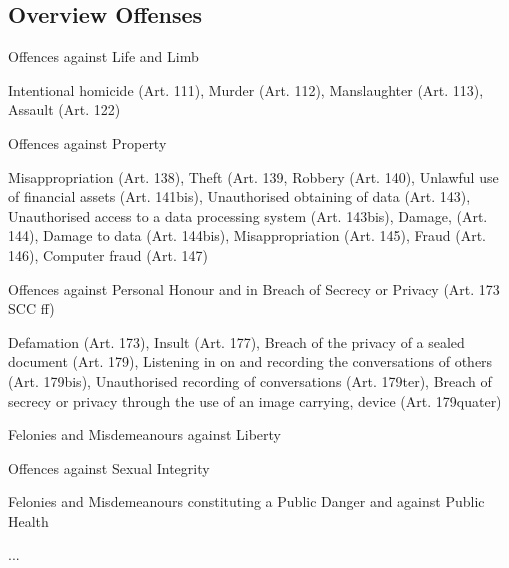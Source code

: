 \subsection{Overview Offenses}
\begin{compactitem}
	\item Offences against Life and Limb
	\begin{compactitem}
		\item Intentional homicide (Art. 111), Murder (Art. 112), Manslaughter (Art. 113), Assault (Art. 122)
	\end{compactitem}
	\item Offences against Property
	\begin{compactitem}
		\item Misappropriation (Art. 138), Theft (Art. 139, Robbery (Art. 140), Unlawful use of financial assets (Art. 141bis), Unauthorised obtaining of data (Art. 143), Unauthorised access to a data processing system (Art. 143bis), Damage, (Art. 144), Damage to data (Art. 144bis), Misappropriation (Art. 145), Fraud (Art. 146), Computer fraud (Art. 147)
	\end{compactitem}
	\item Offences against Personal Honour and in Breach of Secrecy or Privacy (Art. 173 SCC ff)
	\begin{compactitem}
		\item Defamation (Art. 173), Insult (Art. 177), Breach of the privacy of a sealed document (Art. 179), Listening in on and recording the conversations of others (Art. 179bis), Unauthorised recording of conversations (Art. 179ter), Breach of secrecy or privacy through the use of an image carrying, device (Art. 179quater)
	\end{compactitem}
	\item Felonies and Misdemeanours against Liberty
	\item Offences against Sexual Integrity
	\item Felonies and Misdemeanours constituting a Public Danger and against Public Health
	\item ...
\end{compactitem}

